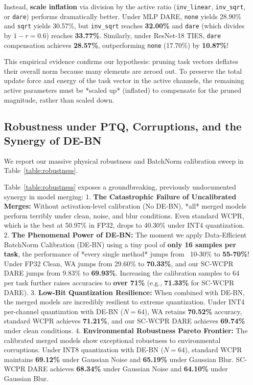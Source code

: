 \documentclass{article}
\theoremstyle{plain}
\theoremstyle{definition}
\theoremstyle{remark}
\begin{document}
Instead, \textbf{scale inflation} via division by the active ratio (\texttt{inv\_linear}, \texttt{inv\_sqrt}, or \texttt{dare}) performs dramatically better. Under MLP DARE, \texttt{none} yields 28.90\% and \texttt{sqrt} yields 30.57\%, but \texttt{inv\_sqrt} reaches \textbf{32.00\%} and \texttt{dare} (which divides by $1-r = 0.6$) reaches \textbf{33.77\%}. Similarly, under ResNet-18 TIES, \texttt{dare} compensation achieves \textbf{28.57\%}, outperforming \texttt{none} (17.70\%) by \textbf{10.87\%}!

This empirical evidence confirms our hypothesis: pruning task vectors deflates their overall norm because many elements are zeroed out. To preserve the total update force and energy of the task vector in the active channels, the remaining active parameters must be *scaled up* (inflated) to compensate for the pruned magnitude, rather than scaled down.

\subsection{Robustness under PTQ, Corruptions, and the Synergy of DE-BN}
\label{sec:debn_results}

We report our massive physical robustness and BatchNorm calibration sweep in Table~\ref{table:robustness}.



Table~\ref{table:robustness} exposes a groundbreaking, previously undocumented synergy in model merging:
1. \textbf{The Catastrophic Failure of Uncalibrated Merges:} Without activation-level calibration (No DE-BN), *all* merged models perform terribly under clean, noise, and blur conditions. Even standard WCPR, which is the best at 50.97\% in FP32, drops to 40.30\% under INT4 quantization.
2. \textbf{The Phenomenal Power of DE-BN:} The moment we apply Data-Efficient BatchNorm Calibration (DE-BN) using a tiny pool of \textbf{only 16 samples per task}, the performance of *every single method* jumps from ~10-30\% to \textbf{55-70\%}! Under FP32 Clean, WA jumps from 29.60\% to \textbf{70.33\%}, and our SC-WCPR DARE jumps from 9.83\% to \textbf{69.93\%}. Increasing the calibration samples to 64 per task further raises accuracies to \textbf{over 71\%} (e.g., \textbf{71.33\%} for SC-WCPR DARE).
3. \textbf{Low-Bit Quantization Resilience:} When combined with DE-BN, the merged models are incredibly resilient to extreme quantization. Under INT4 per-channel quantization with DE-BN ($N=64$), WA retains \textbf{70.52\%} accuracy, standard WCPR achieves \textbf{71.21\%}, and our SC-WCPR DARE achieves \textbf{69.74\%} under clean conditions. 
4. \textbf{Environmental Robustness Pareto Frontier:} The calibrated merged models show exceptional robustness to environmental corruptions. Under INT8 quantization with DE-BN ($N=64$), standard WCPR maintains \textbf{69.12\%} under Gaussian Noise and \textbf{65.19\%} under Gaussian Blur. SC-WCPR DARE achieves \textbf{68.34\%} under Gaussian Noise and \textbf{64.10\%} under Gaussian Blur.
\end{document}
